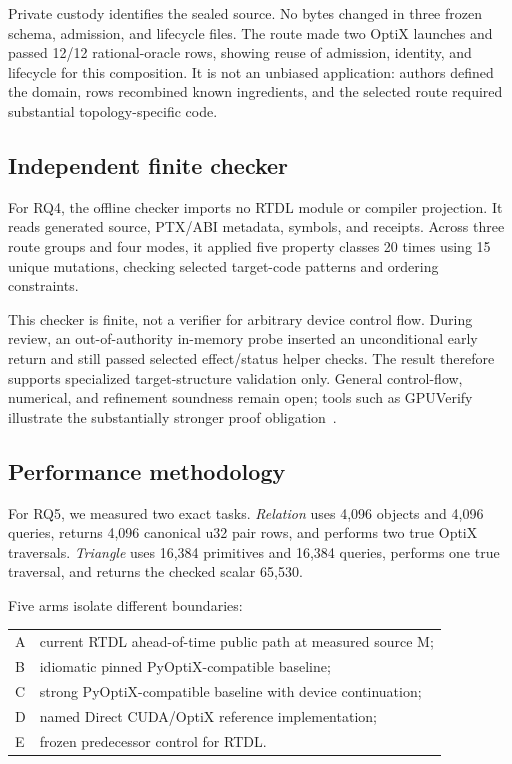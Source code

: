 \documentclass[sigplan,screen,review,anonymous]{acmart}
\newcommand{\rtdl}{\textsc{RTDL}\xspace}
\begin{document}
Private custody identifies the sealed source. No bytes changed in three frozen
schema, admission, and lifecycle files. The route made two OptiX launches and
passed 12/12 rational-oracle rows, showing reuse of admission, identity, and
lifecycle for this composition. It is not an unbiased application: authors
defined the domain, rows recombined known ingredients, and the selected route
required substantial topology-specific code.

\subsection{Independent finite checker}

For RQ4, the offline checker imports no \rtdl module or compiler projection. It reads
generated source, PTX/ABI metadata, symbols, and receipts. Across three route
groups and four modes, it applied five property classes 20 times using 15 unique
mutations, checking selected target-code patterns and ordering constraints.

This checker is finite, not a verifier for arbitrary device control flow.
During review, an out-of-authority in-memory probe inserted an unconditional
early return and still passed selected effect/status helper checks. The result
therefore supports specialized target-structure validation only. General
control-flow, numerical, and refinement soundness remain open; tools such as
GPUVerify illustrate the substantially stronger proof obligation~\cite{betts2012gpuverify}.

\subsection{Performance methodology}

For RQ5, we measured two exact tasks. \emph{Relation} uses 4,096 objects and 4,096
queries, returns 4,096 canonical u32 pair rows, and performs two true OptiX
traversals. \emph{Triangle} uses 16,384 primitives and 16,384 queries, performs
one true traversal, and returns the checked scalar 65,530.

Five arms isolate different boundaries:
\begin{center}
\small
\begin{tabularx}{.95\columnwidth}{@{}lX@{}}
A & current \rtdl ahead-of-time public path at measured source M; \\
B & idiomatic pinned PyOptiX-compatible baseline; \\
C & strong PyOptiX-compatible baseline with device continuation; \\
D & named Direct CUDA/OptiX reference implementation; \\
E & frozen predecessor control for \rtdl. \\
\end{tabularx}
\end{center}
\end{document}

